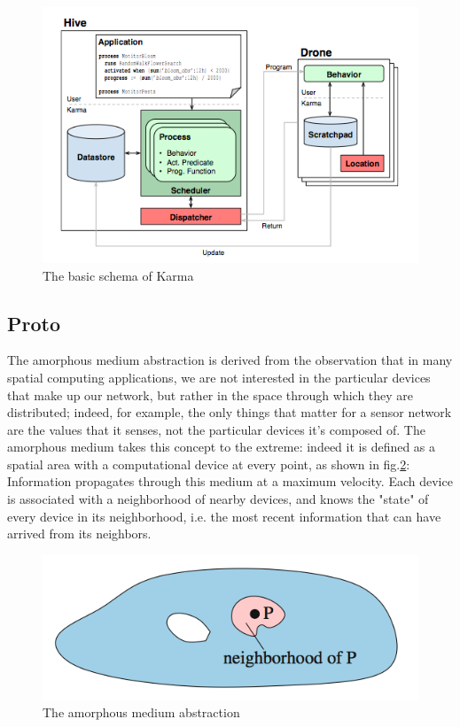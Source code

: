 \begin{figure}[htbp]
  \centering
  \includegraphics[width=\linewidth]{pictures/Karma.png}
  \caption{The basic schema of Karma}
  \label{fig:karma}
\end{figure}

\newpage

\subsection{Proto}\label{proto}

The amorphous medium abstraction\cite{medium} is derived from the observation that in many spatial computing applications, we are not interested in the particular devices that make up our network, but rather in the space through which they are distributed; indeed, for example, the only things that matter for a sensor network are the values that it senses, not the particular devices it's composed of.
The amorphous medium\cite{medium} takes this concept to the extreme: indeed it is defined as a spatial area with a computational device at every point, as shown in fig.\ref{fig:medium}: Information propagates through this medium at a maximum velocity. Each device is associated with a neighborhood of nearby devices, and knows the "state" of every device in its neighborhood, i.e. the most recent information that can have arrived from its neighbors.



\begin{figure}[H]
  \centering
  \includegraphics[width=\linewidth]{pictures/ProtoMedium.png}
  \caption{The amorphous medium abstraction}
  \label{fig:medium}
\end{figure}




